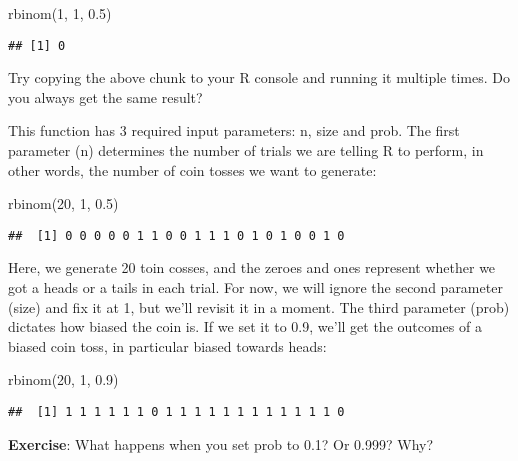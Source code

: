 \documentclass[
]{book}
\newenvironment{Shaded}{\begin{snugshade}}{\end{snugshade}}
\newcommand{\DecValTok}[1]{\textcolor[rgb]{0.00,0.00,0.81}{#1}}
\newcommand{\FloatTok}[1]{\textcolor[rgb]{0.00,0.00,0.81}{#1}}
\newcommand{\FunctionTok}[1]{\textcolor[rgb]{0.00,0.00,0.00}{#1}}
\newcommand{\NormalTok}[1]{#1}
\begin{document}
\begin{Shaded}
\begin{Highlighting}[]
\FunctionTok{rbinom}\NormalTok{(}\DecValTok{1}\NormalTok{, }\DecValTok{1}\NormalTok{, }\FloatTok{0.5}\NormalTok{)}
\end{Highlighting}
\end{Shaded}

\begin{verbatim}
## [1] 0
\end{verbatim}

Try copying the above chunk to your R console and running it multiple times. Do you always get the same result?

This function has 3 required input parameters: n, size and prob. The first parameter (n) determines the number of trials we are telling R to perform, in other words, the number of coin tosses we want to generate:

\begin{Shaded}
\begin{Highlighting}[]
\FunctionTok{rbinom}\NormalTok{(}\DecValTok{20}\NormalTok{, }\DecValTok{1}\NormalTok{, }\FloatTok{0.5}\NormalTok{)}
\end{Highlighting}
\end{Shaded}

\begin{verbatim}
##  [1] 0 0 0 0 0 1 1 0 0 1 1 1 0 1 0 1 0 0 1 0
\end{verbatim}

Here, we generate 20 toin cosses, and the zeroes and ones represent whether we got a heads or a tails in each trial. For now, we will ignore the second parameter (size) and fix it at 1, but we'll revisit it in a moment. The third parameter (prob) dictates how biased the coin is. If we set it to 0.9, we'll get the outcomes of a biased coin toss, in particular biased towards heads:

\begin{Shaded}
\begin{Highlighting}[]
\FunctionTok{rbinom}\NormalTok{(}\DecValTok{20}\NormalTok{, }\DecValTok{1}\NormalTok{, }\FloatTok{0.9}\NormalTok{)}
\end{Highlighting}
\end{Shaded}

\begin{verbatim}
##  [1] 1 1 1 1 1 1 0 1 1 1 1 1 1 1 1 1 1 1 1 0
\end{verbatim}

\textbf{Exercise}: What happens when you set prob to 0.1? Or 0.999? Why?
\end{document}
